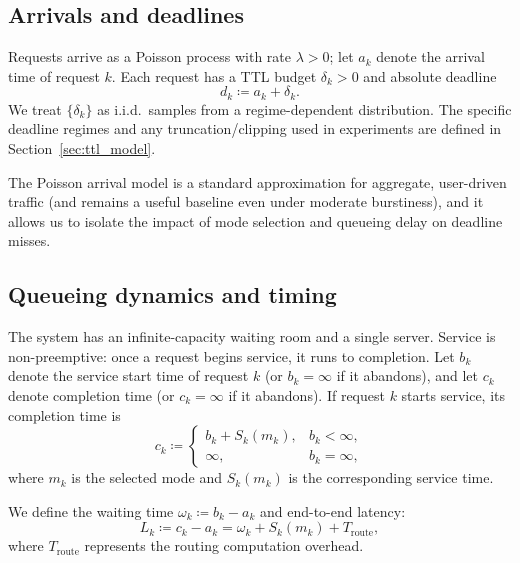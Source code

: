 \documentclass[fleqn,12pt,lineno]{wlpeerj}
\begin{document}
\subsection{Arrivals and deadlines}
\label{sec:arrivals_deadlines}

Requests arrive as a Poisson process with rate $\lambda>0$; let $a_k$ denote the arrival time of request $k$. Each request has a TTL budget $\delta_k>0$ and absolute deadline
\begin{equation}
d_k \coloneqq a_k + \delta_k.
\end{equation}
We treat $\{\delta_k\}$ as i.i.d.\ samples from a regime-dependent distribution. The specific deadline regimes and any truncation/clipping used in experiments are defined in Section~\ref{sec:ttl_model}.

The Poisson arrival model is a standard approximation for aggregate, user-driven traffic (and remains a useful baseline even under moderate burstiness), and it allows us to isolate the impact of mode selection and queueing delay on deadline misses.

\subsection{Queueing dynamics and timing}
\label{sec:queue_dynamics}

The system has an infinite-capacity waiting room and a single server. Service is non-preemptive: once a request begins service, it runs to completion. Let $b_k$ denote the service start time of request $k$ (or $b_k=\infty$ if it abandons), and let $c_k$ denote completion time (or $c_k=\infty$ if it abandons). If request $k$ starts service, its completion time is
\begin{equation}
c_k \coloneqq
\begin{cases}
b_k + S_k(m_k), & b_k < \infty,\\
\infty, & b_k = \infty,
\end{cases}
\end{equation}
where $m_k$ is the selected mode and $S_k(m_k)$ is the corresponding service time.

We define the waiting time $\omega_k \coloneqq b_k - a_k$ and end-to-end latency:
\begin{equation}
L_k \coloneqq c_k - a_k = \omega_k + S_k(m_k) + T_{\text{route}},
\end{equation}
where $T_{\text{route}}$ represents the routing computation overhead.
\end{document}
